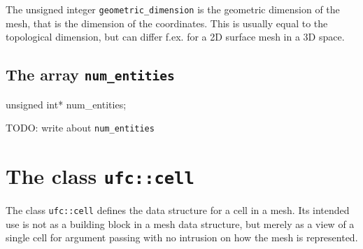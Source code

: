 
The unsigned integer \texttt{geometric\_dimension} is the geometric dimension
of the mesh, that is the dimension of the coordinates.
This is usually equal to the topological dimension, but can differ f.ex. for
a 2D surface mesh in a 3D space.

\subsection{The array \texttt{num\_entities}}


\begin{code}
unsigned int* num_entities;
\end{code}

TODO: write about \texttt{num\_entities}


\section{The class \texttt{ufc::cell}}

The class \texttt{ufc::cell} defines the data structure for a cell in a mesh.
Its intended use is not as a building block in a mesh data structure, but merely as a view
of a single cell for argument passing with no intrusion on how the mesh is represented.









